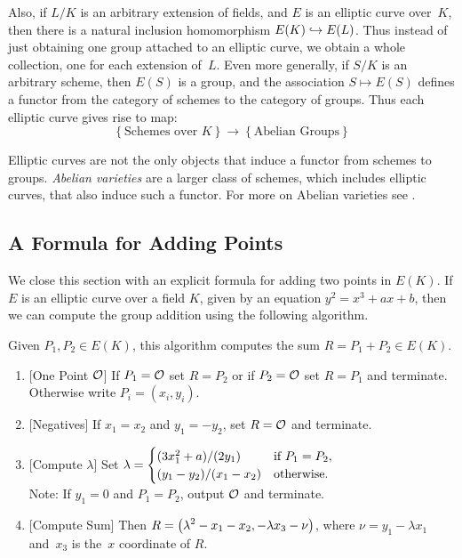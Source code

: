 Also, if $L/K$ is an arbitrary extension of fields, and $E$ is an
elliptic curve over~$K$, then there is a natural inclusion
homomorphism $E(K)\hookrightarrow E(L)$.  Thus instead of just obtaining one group
attached to an elliptic curve, we obtain a whole collection, one for
each extension of~$L$.  Even more generally, if $S/K$ is an arbitrary
scheme, then $E(S)$ is a group, and the association $S\mapsto E(S)$
defines a functor from the category of schemes to the category of
groups.  Thus each elliptic curve gives rise to map:
$$
 \left\{\text{Schemes over $K$}\right\} \longrightarrow
\left\{\text{Abelian Groups}\right\}
$$

\begin{remark}
	Elliptic curves are not the only objects that induce
	a functor from schemes to groups.
	\emph{Abelian varieties} are a larger class of
	schemes, which includes elliptic curves,
    that also induce such a functor.
    For more on Abelian varieties see
    \cite{milne:abvars}.
\end{remark}

\subsection{A Formula for Adding Points}

We close this section with an explicit formula for
adding two points in $E(K)$.
If $E$ is an elliptic curve over a field $K$,
given by an equation $y^2=x^3+ax+b$, then we
can compute the group addition using the following
algorithm.
\begin{algorithm}\label{alg:grouplaw}
Given $P_1, P_2\in E(K)$,
this algorithm computes the sum $R=P_1+P_2 \in E(K)$.
{\sf \begin{enumerate}
\item{}[One Point $\mathcal{O}$] If $P_1=\mathcal{O}$ set $R=P_2$ or if $P_2=\mathcal{O}$ set $R=P_1$
and terminate.  Otherwise write $P_i=(x_i,y_i)$.
\item{}[Negatives]  If $x_1 = x_2$ and $y_1 = -y_2$, set $R=\mathcal{O}$ and terminate.
\item{}[Compute $\lambda$]\label{alg:grouplaw_3}
Set $\displaystyle \lambda = \begin{cases}
 (3x_1^2+a)/(2y_1) & \text{if }P_1 = P_2,\\
(y_1-y_2)/(x_1-x_2) & \text{otherwise.}
\end{cases}$\\
Note: If $y_1=0$ and $P_1=P_2$, output $\mathcal{O}$ and terminate.
\item{}[Compute Sum]\label{alg:grouplaw_4}  Then
$R = \displaystyle \left(\lambda^2 -x_1 - x_2, -\lambda x_3 - \nu\right)$,
where $\nu = y_1 - \lambda x_1$ and~$x_3$ is the~$x$ coordinate of $R$.
\end{enumerate}}
\end{algorithm}

